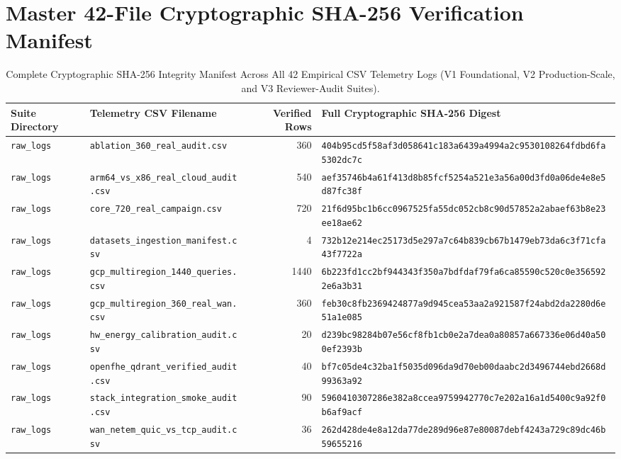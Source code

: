 \documentclass[10pt,journal,compsoc]{IEEEtran}
\begin{document}
\section{Master 42-File Cryptographic SHA-256 Verification Manifest}
\begin{table}[!htbp]\centering\scriptsize
\caption{Complete Cryptographic SHA-256 Integrity Manifest Across All 42 Empirical CSV Telemetry Logs (V1 Foundational, V2 Production-Scale, and V3 Reviewer-Audit Suites).}
\begin{tabular}{@{}llrl@{}}\toprule
\textbf{Suite Directory} & \textbf{Telemetry CSV Filename} & \textbf{Verified Rows} & \textbf{Full Cryptographic SHA-256 Digest} \\\midrule
\texttt{raw\_logs} & \texttt{ablation\_360\_real\_audit.csv} & 360 & \texttt{404b95cd5f58af3d058641c183a6439a4994a2c9530108264fdbd6fa5302dc7c} \\
\texttt{raw\_logs} & \texttt{arm64\_vs\_x86\_real\_cloud\_audit.csv} & 540 & \texttt{aef35746b4a61f413d8b85fcf5254a521e3a56a00d3fd0a06de4e8e5d87fc38f} \\
\texttt{raw\_logs} & \texttt{core\_720\_real\_campaign.csv} & 720 & \texttt{21f6d95bc1b6cc0967525fa55dc052cb8c90d57852a2abaef63b8e23ee18ae62} \\
\texttt{raw\_logs} & \texttt{datasets\_ingestion\_manifest.csv} & 4 & \texttt{732b12e214ec25173d5e297a7c64b839cb67b1479eb73da6c3f71cfa43f7722a} \\
\texttt{raw\_logs} & \texttt{gcp\_multiregion\_1440\_queries.csv} & 1440 & \texttt{6b223fd1cc2bf944343f350a7bdfdaf79fa6ca85590c520c0e3565922e6a3b31} \\
\texttt{raw\_logs} & \texttt{gcp\_multiregion\_360\_real\_wan.csv} & 360 & \texttt{feb30c8fb2369424877a9d945cea53aa2a921587f24abd2da2280d6e51a1e085} \\
\texttt{raw\_logs} & \texttt{hw\_energy\_calibration\_audit.csv} & 20 & \texttt{d239bc98284b07e56cf8fb1cb0e2a7dea0a80857a667336e06d40a500ef2393b} \\
\texttt{raw\_logs} & \texttt{openfhe\_qdrant\_verified\_audit.csv} & 40 & \texttt{bf7c05de4c32ba1f5035d096da9d70eb00daabc2d3496744ebd2668d99363a92} \\
\texttt{raw\_logs} & \texttt{stack\_integration\_smoke\_audit.csv} & 90 & \texttt{5960410307286e382a8ccea9759942770c7e202a16a1d5400c9a92f0b6af9acf} \\
\texttt{raw\_logs} & \texttt{wan\_netem\_quic\_vs\_tcp\_audit.csv} & 36 & \texttt{262d428de4e8a12da77de289d96e87e80087debf4243a729c89dc46b59655216} \\

\end{tabular}
\end{table}
\end{document}
